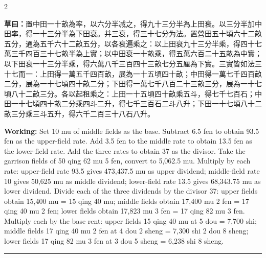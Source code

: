 \documentclass[11pt,a4paper]{article}
\newcommand{\longline}{\noindent\rule{\textwidth}{0.4pt}}
\newcommand{\WorkingText}[1]{\par\noindent\textbf{草曰：}#1\par}
\newcommand{\WorkingEn}[1]{\par\noindent\textbf{Working:} #1\par}
\begin{document}
\begin{paracol}{2}
\WorkingText{置中田一十畝為率，以六分半减之，得九十三分半為上田衰。以三分半加中田率，得一十三分半為下田衰。并三衰，得三十七分为法。置營田五十頃六十二畝五分，通為五千六十二畝五分，以各衰遍乘之：以上田衰九十三分半乘，得四十七萬三千四百三十七畝半為上實；以中田衰一十畝乘，得五萬六百二十五畝為中實；以下田衰一十三分半乘，得六萬八千三百四十三畝七分五厘為下實。三實皆如法三十七而一：上田得一萬五千四百畝，展為一十五頃四十畝；中田得一萬七千四百畝二分，展為一十七頃四十畝二分；下田得一萬七千八百二十三畝三分，展為一十七頃八十二畝三分。各以起租乘之：上田一十五頃四十畝乘五斗，得七千七百石；中田一十七頃四十畝二分乘四斗二升，得七千三百石二斗八升；下田一十七頃八十二畝三分乘三斗五升，得六千二百三十八石八升。}
\switchcolumn
\WorkingEn{Set 10 mu of middle fields as the base. Subtract 6.5 fen to obtain 93.5 fen as the upper-field rate. Add 3.5 fen to the middle rate to obtain 13.5 fen as the lower-field rate. Add the three rates to obtain 37 as the divisor. Take the garrison fields of 50 qing 62 mu 5 fen, convert to 5,062.5 mu. Multiply by each rate: upper-field rate 93.5 gives 473,437.5 mu as upper dividend; middle-field rate 10 gives 50,625 mu as middle dividend; lower-field rate 13.5 gives 68,343.75 mu as lower dividend. Divide each of the three dividends by the divisor 37: upper fields obtain 15,400 mu = 15 qing 40 mu; middle fields obtain 17,400 mu 2 fen = 17 qing 40 mu 2 fen; lower fields obtain 17,823 mu 3 fen = 17 qing 82 mu 3 fen. Multiply each by the base rent: upper fields 15 qing 40 mu at 5 dou = 7,700 shi; middle fields 17 qing 40 mu 2 fen at 4 dou 2 sheng = 7,300 shi 2 dou 8 sheng; lower fields 17 qing 82 mu 3 fen at 3 dou 5 sheng = 6,238 shi 8 sheng.}

\end{paracol}

\longline
\end{document}
